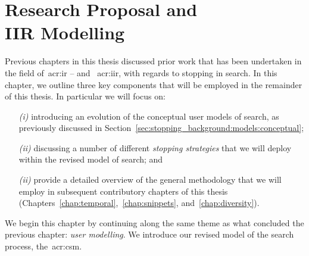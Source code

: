 
\chapter[Models and Proposal]{Research Proposal and\\IIR Modelling}\label{chap:proposal}


Previous chapters in this thesis discussed prior work that has been undertaken in the field of~\gls{acr:ir} -- and ~\gls{acr:iir}, with regards to stopping in search. In this chapter, we outline three key components that will be employed in the remainder of this thesis. In particular we will focus on:

\begin{itemize}
    \item[\emph{(i)}]{introducing an evolution of the conceptual user models of search, as previously discussed in Section~\ref{sec:stopping_background:models:conceptual};}
    \item[\emph{(ii)}]{discussing a number of different \emph{stopping strategies} that we will deploy within the revised model of search; and}
    \item[\emph{(ii)}]{provide a detailed overview of the general methodology that we will employ in subsequent contributory chapters of this thesis (Chapters~\ref{chap:temporal},~\ref{chap:snippets}, and~\ref{chap:diversity}).}
\end{itemize}

We begin this chapter by continuing along the same theme as what concluded the previous chapter: \emph{user modelling}. We introduce our revised model of the search process, the~\gls{acr:csm}.

